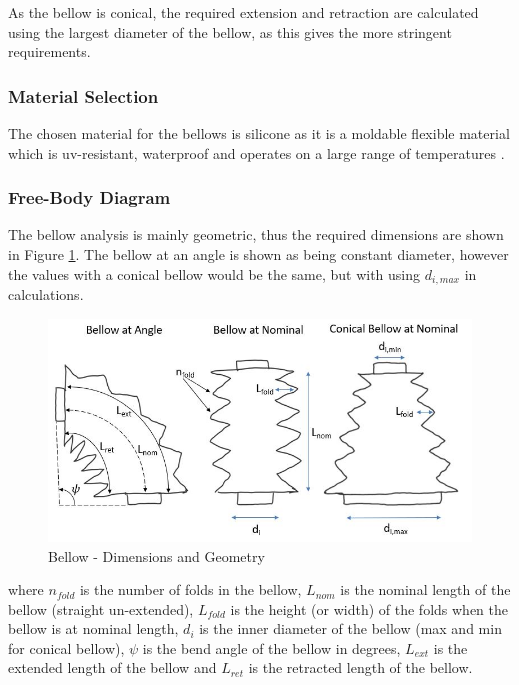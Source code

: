 As the bellow is conical, the required extension and retraction are calculated using the largest diameter of the bellow, as this gives the more stringent requirements.

\subsubsection{Material Selection}
The chosen material for the bellows is silicone as it is a moldable flexible material which is uv-resistant, waterproof and operates on a large range of temperatures \cite{custom_rubber_corp_rubber_nodate}.

\subsubsection{Free-Body Diagram}
The bellow analysis is mainly geometric, thus the required dimensions are shown in Figure \ref{fig:bellow}. The bellow at an angle is shown as being constant diameter, however the values with a conical bellow would be the same, but with using $d_{i,max}$ in calculations.

\begin{figure}
    \centering
    \includegraphics[width=\textwidth]{4_Analysis/img/Bellow/bellow.JPG}
    \caption{Bellow - Dimensions and Geometry}
    \label{fig:bellow}
\end{figure}

where $n_{fold}$ is the number of folds in the bellow, $L_{nom}$ is the nominal length of the bellow (straight un-extended), $L_{fold}$ is the height (or width) of the folds when the bellow is at nominal length, $d_i$ is the inner diameter of the bellow (max and min for conical bellow), $\psi$ is the bend angle of the bellow in degrees, $L_{ext}$ is the extended length of the bellow and $L_{ret}$ is the retracted length of the bellow.

